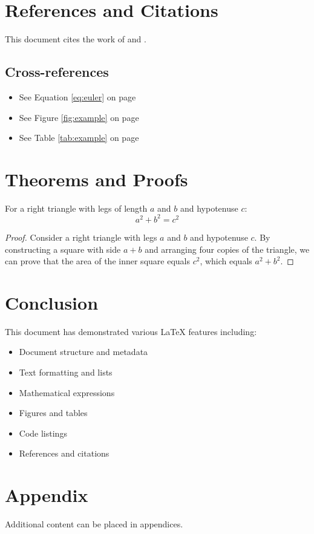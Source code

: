 \documentclass[12pt,a4paper]{article}
\begin{document}
\section{References and Citations}

This document cites the work of \cite{knuth1984} and \cite{lamport1994}.

\subsection{Cross-references}

\begin{itemize}
    \item See Equation \ref{eq:euler} on page \pageref{eq:euler}
    \item See Figure \ref{fig:example} on page \pageref{fig:example}
    \item See Table \ref{tab:example} on page \pageref{tab:example}
\end{itemize}

\section{Theorems and Proofs}

\begin{theorem}
For a right triangle with legs of length $a$ and $b$ and hypotenuse $c$:
\[
a^2 + b^2 = c^2
\]
\end{theorem}

\begin{proof}
Consider a right triangle with legs $a$ and $b$ and hypotenuse $c$. By constructing a square with side $a+b$ and arranging four copies of the triangle, we can prove that the area of the inner square equals $c^2$, which equals $a^2 + b^2$.
\end{proof}

\section{Conclusion}

This document has demonstrated various LaTeX features including:
\begin{itemize}
    \item Document structure and metadata
    \item Text formatting and lists
    \item Mathematical expressions
    \item Figures and tables
    \item Code listings
    \item References and citations
\end{itemize}




\appendix

\section{Appendix}

Additional content can be placed in appendices.
\end{document}
